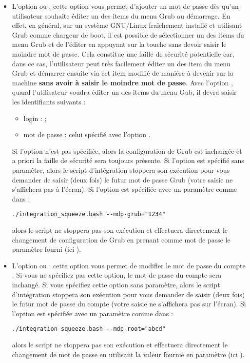 \begin{itemize}
\item L'option  ou  :
cette option vous permet d'ajouter un mot de passe dès qu'un utilisateur
souhaite éditer un des items du menu Grub au démarrage. 
En effet, en général, sur
un système GNU/Linux fraîchement installé et utilisant Grub comme chargeur de
boot, il est possible de sélectionner un des items du menu Grub et de 
l'éditer en appuyant sur la touche  sans devoir saisir le moindre
mot de passe. Cela constitue une faille de sécurité potentielle car, dans ce cas,
l'utilisateur peut très facilement éditer un des item du menu Grub et démarrer
ensuite via cet item modifié
de manière à devenir  sur la machine \textbf{sans avoir à saisir
le moindre mot de passe}. Avec l'option , quand l'utilisateur voudra
éditer un des items du menu Gub, il devra saisir les identifiants suivants :
%
\begin{itemize}
\item login :  ;
\item mot de passe : celui spécifié avec l'option .
\end{itemize}
%
Si l'option  n'est pas spécifiée, alors la configuration
de Grub est inchangée et a priori la faille de sécurité sera toujours présente.
Si l'option est spécifié sans paramètre, alors le script d'intégration
stoppera son exécution pour vous demander de saisir (deux fois) le futur mot 
de passe Grub (votre saisie ne s'affichera pas à l'écran). Si l'option est
spécifiée avec un paramètre comme dans :
%
\begin{lstlisting}
./integration_squeeze.bash --mdp-grub="1234"
\end{lstlisting}
%
alors le script ne stoppera pas son exécution et effectuera directement
le changement de configuration de Grub en prenant comme mot de passe
le paramètre fourni (ici ).

\item L'option  ou  :
cette option vous permet de modifier le mot de passe du compte
. Si vous ne spécifiez pas cette option, le mot
de passe du compte  sera inchangé. Si vous spécifiez
cette option sans paramètre, alors le script d'intégration
stoppera son exécution pour vous demander de saisir (deux fois)
le futur mot de passe du compte  (votre saisie
ne s'affichera pas sur l'écran). Si l'option est spécifiée avec 
un paramètre comme dans :
%
\begin{lstlisting}
./integration_squeeze.bash --mdp-root="abcd"
\end{lstlisting}
%
alors le script ne stoppera pas son exécution et effectuera directement
le changement de mot de passe en utilisant la valeur fournie en
paramètre (ici ).


\end{itemize}
